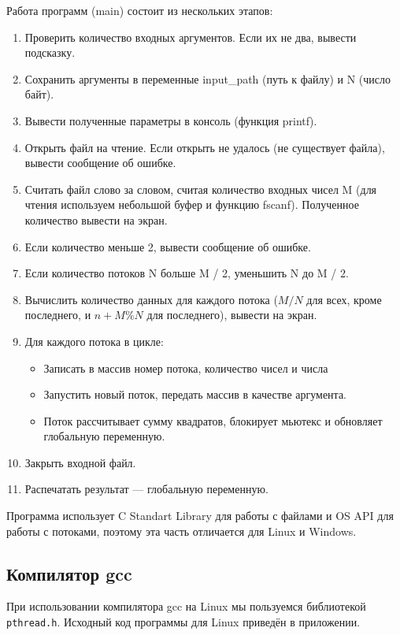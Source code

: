 Работа программ (main) состоит из нескольких этапов:
\begin{enumerate}
    \item Проверить количество входных аргументов. Если их не два, вывести подсказку.
    \item Сохранить аргументы в переменные input\_path (путь к файлу) и N (число байт).
    \item Вывести полученные параметры в консоль (функция printf).
    \item Открыть файл на чтение. Если открыть не удалось (не существует файла), вывести сообщение об ошибке.
    \item Считать файл слово за словом, считая количество входных чисел M (для чтения используем небольшой буфер и функцию fscanf). Полученное количество вывести на экран.
    \item Если количество меньше 2, вывести сообщение об ошибке.
    \item Если количество потоков N больше M / 2, уменьшить N до M / 2.
    \item Вычислить количество данных для каждого потока ($M / N$ для всех, кроме последнего, и $n + M \% N$ для последнего), вывести на экран.
    \item Для каждого потока в цикле:
    \begin{itemize}
        \item Записать в массив номер потока, количество чисел и числа
        \item Запустить новый поток, передать массив в качестве аргумента.
        \item Поток рассчитывает сумму квадратов, блокирует мьютекс и обновляет глобальную переменную.
    \end{itemize}
    \item Закрыть входной файл.
    \item Распечатать результат — глобальную переменную.
\end{enumerate}


Программа использует C Standart Library для работы с файлами и OS API для работы с потоками, поэтому эта часть отличается для Linux и Windows.

\subsection{Компилятор gcc}

При использовании компилятора gcc на Linux мы пользуемся библиотекой \texttt{pthread.h}. Исходный код программы для Linux приведён в приложении.


